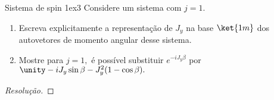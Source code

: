 \begin{exercício}{Sistema de spin 1}{ex3}
    Considere um sistema com \(j = 1\).
    \begin{enumerate}[label=(\alph*)]
        \item Escreva explicitamente a representação de \(J_y\) na base \(\ket{1m}\) dos autovetores de momento angular desse sistema.
        \item Mostre para \(j = 1,\) é possível substituir \(e^{-i J_y \beta}\) por \(\unity - i J_y \sin \beta - J_y^2(1 - \cos \beta).\)
    \end{enumerate}
\end{exercício}
\begin{proof}[Resolução]
    
\end{proof}
